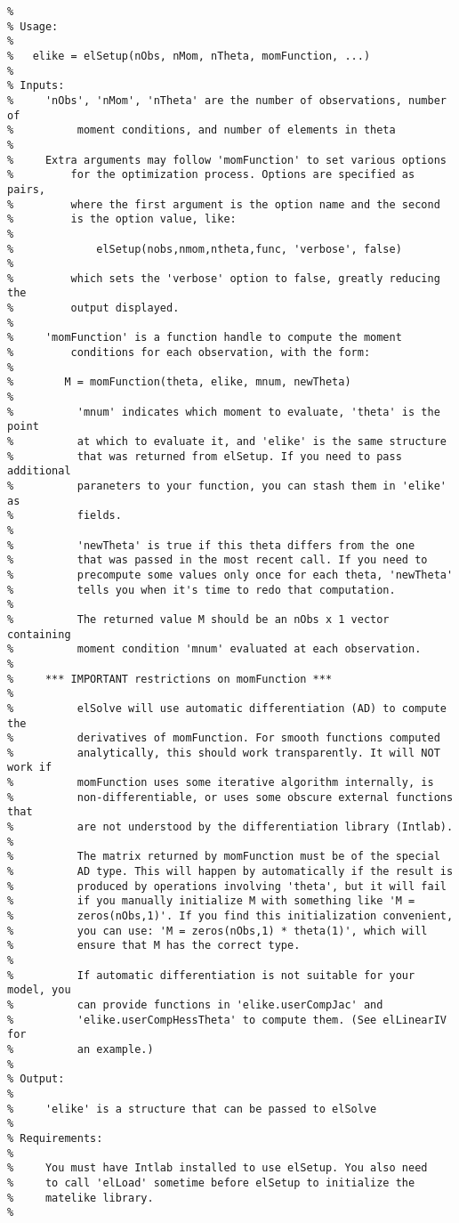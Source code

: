 \begin{lstlisting}[commentstyle=\ttfamily]
% Initializes an EL (or other Cressie-Read) problem
%
% Usage:
%
%   elike = elSetup(nObs, nMom, nTheta, momFunction, ...)
%
% Inputs:
%     'nObs', 'nMom', 'nTheta' are the number of observations, number of
%          moment conditions, and number of elements in theta
%
%     Extra arguments may follow 'momFunction' to set various options
%         for the optimization process. Options are specified as pairs,
%         where the first argument is the option name and the second
%         is the option value, like:
%
%             elSetup(nobs,nmom,ntheta,func, 'verbose', false)
%
%         which sets the 'verbose' option to false, greatly reducing the
%         output displayed.
%
%     'momFunction' is a function handle to compute the moment
%         conditions for each observation, with the form:
%      
%        M = momFunction(theta, elike, mnum, newTheta)
%
%          'mnum' indicates which moment to evaluate, 'theta' is the point
%          at which to evaluate it, and 'elike' is the same structure
%          that was returned from elSetup. If you need to pass additional
%          paraneters to your function, you can stash them in 'elike' as
%          fields.
%
%          'newTheta' is true if this theta differs from the one
%          that was passed in the most recent call. If you need to
%          precompute some values only once for each theta, 'newTheta'
%          tells you when it's time to redo that computation.
%
%          The returned value M should be an nObs x 1 vector containing
%          moment condition 'mnum' evaluated at each observation.
%          
%     *** IMPORTANT restrictions on momFunction ***
%
%          elSolve will use automatic differentiation (AD) to compute the
%          derivatives of momFunction. For smooth functions computed
%          analytically, this should work transparently. It will NOT work if
%          momFunction uses some iterative algorithm internally, is
%          non-differentiable, or uses some obscure external functions that
%          are not understood by the differentiation library (Intlab).
%
%          The matrix returned by momFunction must be of the special
%          AD type. This will happen by automatically if the result is
%          produced by operations involving 'theta', but it will fail
%          if you manually initialize M with something like 'M =
%          zeros(nObs,1)'. If you find this initialization convenient,
%          you can use: 'M = zeros(nObs,1) * theta(1)', which will
%          ensure that M has the correct type.
%
%          If automatic differentiation is not suitable for your model, you
%          can provide functions in 'elike.userCompJac' and
%          'elike.userCompHessTheta' to compute them. (See elLinearIV for
%          an example.)
%
% Output:
%
%     'elike' is a structure that can be passed to elSolve
%
% Requirements:
%
%     You must have Intlab installed to use elSetup. You also need
%     to call 'elLoad' sometime before elSetup to initialize the
%     matelike library.
%
\end{lstlisting}


